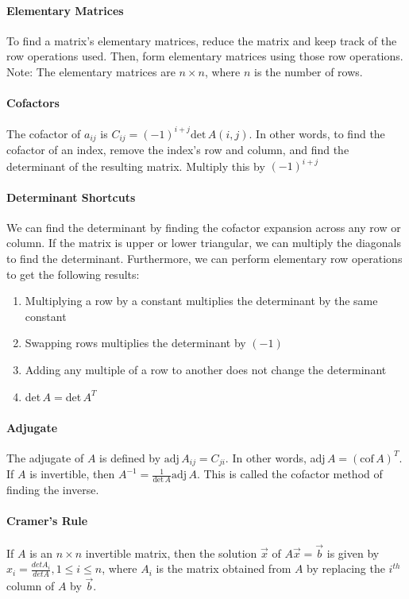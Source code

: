 \documentclass[10pt,letter]{article}
\begin{document}
\paragraph{Elementary Matrices} To find a matrix's elementary matrices, reduce the matrix and keep track of the row operations used. Then, form elementary matrices using those row operations. Note: The elementary matrices are $n\times n$, where $n$ is the number of rows. 

\paragraph{Cofactors} The cofactor of $a_{ij}$ is $C_{ij}=(-1)^{i+j}\text{det}\,A(i,j)$. In other words, to find the cofactor of an index, remove the index's row and column, and find the determinant of the resulting matrix. Multiply this by $(-1)^{i+j}$ 

\paragraph{Determinant Shortcuts} We can find the determinant by finding the cofactor expansion across any row or column. If the matrix is upper or lower triangular, we can multiply the diagonals to find the determinant. Furthermore, we can perform elementary row operations to get the following results: \begin{enumerate}
    \item Multiplying a row by a constant multiplies the determinant by the same constant 
    \item Swapping rows multiplies the determinant by $(-1)$ 
    \item Adding any multiple of a row to another does not change the determinant 
    \item det$\,A=$det$\,A^T$
\end{enumerate}

\paragraph{Adjugate} The adjugate of $A$ is defined by $\text{adj}\,A_{ij}=C_{ji}$. In other words, adj$\,A=(\text{cof}\,A)^T$. If $A$ is invertible, then $A^{-1}=\frac{1}{\text{det}\,A}\text{adj}\,A$. This is called the cofactor method of finding the inverse. 

\paragraph{Cramer's Rule} If $A$ is an $n\times n$ invertible matrix, then the solution $\vec{x}$ of $A\vec{x}=\vec{b}$ is given by $x_i=\frac{detA_i}{detA},1\leq i\leq n$, where $A_i$ is the matrix obtained from $A$ by replacing the $i^{th}$ column of $A$ by $\vec{b}$. 
\end{document}
